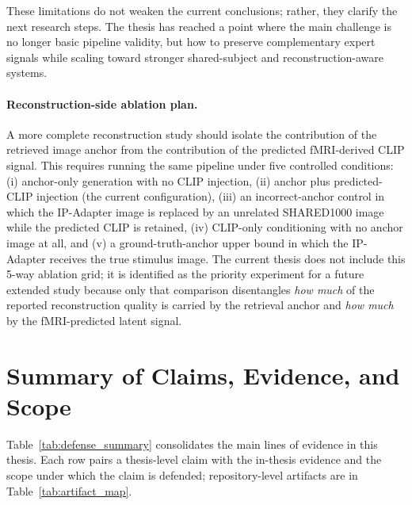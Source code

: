 These limitations do not weaken the current conclusions; rather, they clarify the next research steps. The thesis has reached a point where the main challenge is no longer basic pipeline validity, but how to preserve complementary expert signals while scaling toward stronger shared-subject and reconstruction-aware systems.

\paragraph{Reconstruction-side ablation plan.} A more complete reconstruction study should isolate the contribution of the retrieved image anchor from the contribution of the predicted fMRI-derived CLIP signal. This requires running the same pipeline under five controlled conditions: (i) anchor-only generation with no CLIP injection, (ii) anchor plus predicted-CLIP injection (the current configuration), (iii) an incorrect-anchor control in which the IP-Adapter image is replaced by an unrelated SHARED1000 image while the predicted CLIP is retained, (iv) CLIP-only conditioning with no anchor image at all, and (v) a ground-truth-anchor upper bound in which the IP-Adapter receives the true stimulus image. The current thesis does not include this 5-way ablation grid; it is identified as the priority experiment for a future extended study because only that comparison disentangles \emph{how much} of the reported reconstruction quality is carried by the retrieval anchor and \emph{how much} by the fMRI-predicted latent signal.

\section{Summary of Claims, Evidence, and Scope}
\label{sec:claim_register}

Table~\ref{tab:defense_summary} consolidates the main lines of evidence in this thesis. Each row pairs a thesis-level claim with the in-thesis evidence and the scope under which the claim is defended; repository-level artifacts are in Table~\ref{tab:artifact_map}.

